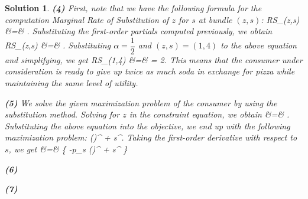 \documentclass{article} %
\def\eQb#1\eQe{\begin{eqnarray*}#1\end{eqnarray*}}
\theoremstyle{quest}
\newtheorem*{solution}{Solution}
\begin{document}
\begin{solution}
\smallskip

\textbf{(4)}
First, note that we have the following formula for the 
computation Marginal Rate of Substitution of $z$ for $s$ at bundle $(z,s)$:
\eQb
MRS_{}(z,s) &=& .
\eQe
Substituting the first-order partials computed previously, we obtain
\eQb
MRS_{}(z,s) &=& .
\eQe
Substituting $\alpha = \dfrac{1}{2}$ and $(z,s) = (1,4)$ to the above equation and simplifying, we get
\eQb
MRS_{}(1,4) &=&  = 2.
\eQe
This means that the consumer under consideration is ready to give up twice as much soda 
in exchange for pizza while maintaining the same level of utility.

\pagebreak

\textbf{(5)}
We solve the given maximization problem of the consumer by using the substitution method. 
Solving for $z$ in the constraint equation, we obtain
\eQb
z &=& .
\eQe
Substituting the above equation into the objective, we end up with the following 
maximization problem:
\eQb
\underset{ \{ s \} }{\text{max}} \>  ()^{} + 
s^{}. 
\eQe
Taking the first-order derivative with respect to $s$, we get
\eQb
\dfrac{\partial U}{\partial s} &=& 
\{ -p_s \cdot ()^{} + s^{} \}
\eQe

\smallskip

\textbf{(6)}

\smallskip

\textbf{(7)}


\end{solution}
\end{document}
